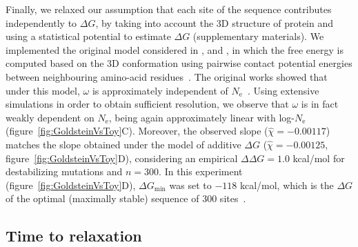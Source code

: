 \documentclass[authoryear]{elsarticle} %
\newcommand{\Ne}{N_{\text{e}}} %
\newcommand{\NbrSites}{n} %
\newcommand{\G}{G} %
\newcommand{\DeltaG}{\Delta \G} %
\newcommand{\EmpiricalDeltaDeltaG}{\Delta \DeltaG} %
\newcommand{\EmpiricalDeltaGmin}{\DeltaG_{\text{min}}} %
\begin{document}
Finally, we relaxed our assumption that each site of the sequence contributes independently to $\DeltaG$, by taking into account the 3D structure of protein and using a statistical potential to estimate $\DeltaG$ (supplementary materials).
We implemented the original model considered in \citet{Williams2006}, \citet{Goldstein2011} and \citet{Pollock2012}, in which the free energy is computed based on the 3D conformation using pairwise contact potential energies between neighbouring amino-acid residues~\citep{Miyazawa1985}.
The original works showed that under this model, $\omega$ is approximately independent of $\Ne$~\citep{Goldstein2013}.
Using extensive simulations in order to obtain sufficient resolution, we observe that $\omega$ is in fact weakly dependent on $\Ne$, being again approximately linear with log-$\Ne$ (figure~\ref{fig:GoldsteinVsToy}C).
Moreover, the observed slope ($\widehat{\chi}=-0.00117$) matches the slope obtained under the model of additive $\DeltaG$ ($\widehat{\chi}=-0.00125$, figure~\ref{fig:GoldsteinVsToy}D), considering an empirical $\EmpiricalDeltaDeltaG = 1.0$ kcal/mol for destabilizing mutations and $\NbrSites=300$.
In this experiment (figure~\ref{fig:GoldsteinVsToy}D), $\EmpiricalDeltaGmin$ was set to $-118$ kcal/mol, which is the $\DeltaG$ of the optimal (maximally stable) sequence of $300$ sites~\citep{Goldstein2011}.

\subsection{Time to relaxation}
\end{document}
